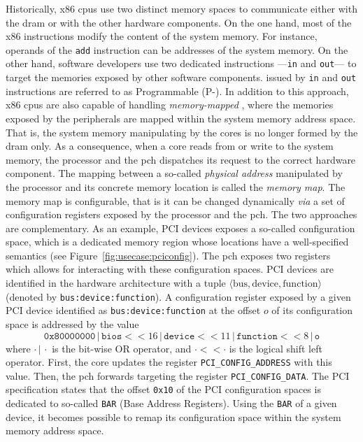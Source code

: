 Historically, x86 \acp{cpu} use two distinct memory spaces to communicate either
with the \ac{dram} or with the other hardware components.
%
On the one hand, most of the x86 instructions modify the content of the system
memory.
%
For instance, operands of the \texttt{add} instruction can be addresses of the
system memory.
%
On the other hand, software developers use two dedicated instructions
---\texttt{in} and \texttt{out}--- to target the memories exposed by other
software components.
%
\IOs issued by \texttt{in} and \texttt{out} instructions are referred to as
Programmable \IOs (P-\IOs).
%
In addition to this approach, x86 \acp{cpu} are also capable of handling
\emph{memory-mapped} \IOs, where the memories exposed by the peripherals are
mapped within the system memory address space.
%
That is, the system memory manipulating by the cores is no longer formed by the
\ac{dram} only.
%
As a consequence, when a core reads from or write to the system memory, the
processor and the \ac{pch} dispatches its request to the correct hardware
component.
%
The mapping between a so-called \emph{physical address} manipulated by the
processor and its concrete memory location is called the \emph{memory map}.
%
The memory map is configurable, that is it can be changed dynamically \emph{via}
a set of configuration registers exposed by the processor and the \ac{pch}.
%
The two approaches are complementary.
%
As an example, PCI devices exposes a so-called configuration space, which is a
dedicated memory region whose locations have a well-specified semantics (see
Figure~\ref{fig:usecase:pciconfig}).
%
The \ac{pch} exposes two registers which allows for interacting with these
configuration spaces.
%
PCI devices are identified in the hardware architecture with a tuple
\( \langle \mathrm{bus}, \mathrm{device}, \mathrm{function} \rangle \) (denoted
by \texttt{bus:device:function}).
%
A configuration register exposed by a given PCI device identified as
\texttt{bus:device:function} at the offset \( o \) of its configuration space is
addressed by the value
%
\[
  \mathtt{0x80000000}\,|\,\texttt{bios} <\!\!< 16\,|\,\texttt{device} <\!\!<
  11\,|\,\texttt{function} <\!\!< 8\,|\,\texttt{o}
\]
%
where \(\cdot\,|\,\cdot\) is the bit-wise OR operator, and
\(\cdot <\!\!< \cdot\) is the logical shift left operator.
%
First, the core updates the register \texttt{PCI\_CONFIG\_ADDRESS} with this
value.
%
Then, the \ac{pch} forwards \IOs targeting the register
\texttt{PCI\_CONFIG\_DATA}.
%
The PCI specification states that the offset \texttt{0x10} of the PCI
configuration spaces is dedicated to so-called \texttt{BAR} (Base Address
Registers).
%
Using the \texttt{BAR} of a given device, it becomes possible to remap its
configuration space within the system memory address space.

